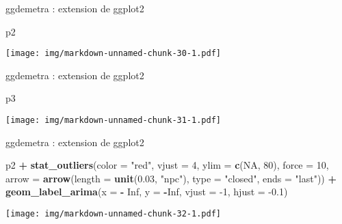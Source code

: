 \documentclass[10pt,xcolor=table,color={dvipsnames,usenames},ignorenonframetext,usepdftitle=false,french]{beamer}
\newenvironment{Shaded}{\begin{snugshade}}{\end{snugshade}}
\newcommand{\DataTypeTok}[1]{\textcolor[rgb]{0.13,0.29,0.53}{#1}}
\newcommand{\DecValTok}[1]{\textcolor[rgb]{0.00,0.00,0.81}{#1}}
\newcommand{\FloatTok}[1]{\textcolor[rgb]{0.00,0.00,0.81}{#1}}
\newcommand{\KeywordTok}[1]{\textcolor[rgb]{0.13,0.29,0.53}{\textbf{#1}}}
\newcommand{\NormalTok}[1]{#1}
\newcommand{\OperatorTok}[1]{\textcolor[rgb]{0.81,0.36,0.00}{\textbf{#1}}}
\newcommand{\OtherTok}[1]{\textcolor[rgb]{0.56,0.35,0.01}{#1}}
\newcommand{\StringTok}[1]{\textcolor[rgb]{0.31,0.60,0.02}{#1}}
\begin{document}
\begin{frame}[fragile]{ggdemetra : extension de ggplot2}
\protect\hypertarget{ggdemetra-extension-de-ggplot2-3}{}

\begin{Shaded}
\begin{Highlighting}[]
\NormalTok{p2}
\end{Highlighting}
\end{Shaded}

\texttt{[image: img/markdown-unnamed-chunk-30-1.pdf]}

\end{frame}

\begin{frame}[fragile]{ggdemetra : extension de ggplot2}
\protect\hypertarget{ggdemetra-extension-de-ggplot2-4}{}

\begin{Shaded}
\begin{Highlighting}[]
\NormalTok{p3}
\end{Highlighting}
\end{Shaded}

\texttt{[image: img/markdown-unnamed-chunk-31-1.pdf]}

\end{frame}

\begin{frame}[fragile]{ggdemetra : extension de ggplot2}
\protect\hypertarget{ggdemetra-extension-de-ggplot2-5}{}

\footnotesize

\begin{Shaded}
\begin{Highlighting}[]
\NormalTok{p2 }\OperatorTok{+}\StringTok{ }\KeywordTok{stat_outliers}\NormalTok{(}\DataTypeTok{color =} \StringTok{"red"}\NormalTok{, }\DataTypeTok{vjust =} \DecValTok{4}\NormalTok{, }\DataTypeTok{ylim =} \KeywordTok{c}\NormalTok{(}\OtherTok{NA}\NormalTok{, }\DecValTok{80}\NormalTok{), }\DataTypeTok{force =} \DecValTok{10}\NormalTok{,}
                   \DataTypeTok{arrow =} \KeywordTok{arrow}\NormalTok{(}\DataTypeTok{length =} \KeywordTok{unit}\NormalTok{(}\FloatTok{0.03}\NormalTok{, }\StringTok{"npc"}\NormalTok{),}
                                 \DataTypeTok{type =} \StringTok{"closed"}\NormalTok{, }\DataTypeTok{ends =} \StringTok{"last"}\NormalTok{))   }\OperatorTok{+}
\StringTok{  }\KeywordTok{geom_label_arima}\NormalTok{(}\DataTypeTok{x =} \OperatorTok{-}\StringTok{ }\OtherTok{Inf}\NormalTok{, }\DataTypeTok{y =} \OperatorTok{-}\OtherTok{Inf}\NormalTok{, }\DataTypeTok{vjust =} \DecValTok{-1}\NormalTok{, }\DataTypeTok{hjust =} \FloatTok{-0.1}\NormalTok{)}
\end{Highlighting}
\end{Shaded}

\texttt{[image: img/markdown-unnamed-chunk-32-1.pdf]}

\end{frame}
\end{document}
